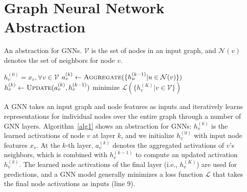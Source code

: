 \section{Graph Neural Network Abstraction}
\begin{algorithm}[t]
\caption{An abstraction for GNNs. $\mathcal{V}$ is the set of nodes in an input graph, and $\mathcal{N}(v)$ denotes the set of neighbors for node $v$.}
\label{alg1}
\begin{algorithmic}[1]
\State $h^{(0)}_v = x_v, \forall v \in \mathcal{V}$
\State $a^{(k)}_v \leftarrow \Call{Aggregate}{\{h^{(k-1)}_u | u \in \mathcal{N}(v)\}}$
\State $h^{(k)}_v \leftarrow \Call{Update}{a^{(k)}_v, h^{(k-1)}_v}$
\EndFor
\EndFor
\State
{} minimize $\mathcal{L}(\{h^{(K)}_v | v \in \mathcal{V}\})$
\end{algorithmic}
\end{algorithm}
A GNN takes an input graph and node features as inputs and iteratively learns representations for individual nodes over the entire graph through a number of GNN layers.
Algorithm~\ref{alg1} shows an abstraction for GNNs: $h^{(k)}_v$ is the learned activations of node $v$ at layer $k$, and we initialize $h^{(0)}_v$ with input node features $x_v$.
At the $k$-th layer, $a^{(k)}_v$ denotes the aggregated activations of $v$'s neighbors, which is combined with $h^{(k-1)}_v$ to compute an updated activation $h^{(k)}_v$.
The learned node activations of the final layer (i.e., $h^{(K)}_v$) are used for predictions, and a GNN model generally minimizes a loss function $\mathcal{L}$ that takes the final node activations as inputs (line 9).

